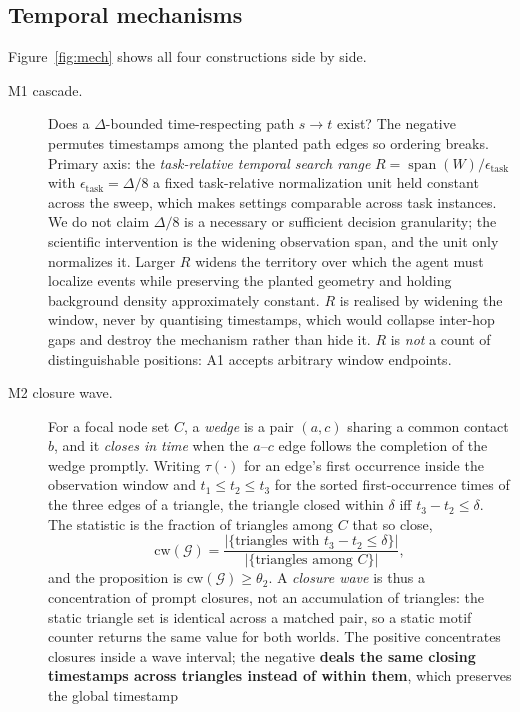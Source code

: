 \documentclass[sigconf,anonymous,review]{acmart}
\begin{document}
\subsection{Temporal mechanisms}
Figure~\ref{fig:mech} shows all four constructions side by side.

\begin{description}
\item[M1 cascade.] Does a $\Delta$-bounded time-respecting path $s\!\to\!t$ exist? The negative
permutes timestamps among the planted path edges so ordering breaks. Primary axis: the \emph{task-relative temporal
search range} $R=\operatorname{span}(W)/\epsilon_{\text{task}}$ with
$\epsilon_{\text{task}}=\Delta/8$ a fixed task-relative normalization unit
held constant across the sweep, which makes settings comparable across task instances. We do not
claim $\Delta/8$ is a necessary or sufficient decision granularity; the scientific intervention is
the widening observation span, and the unit only normalizes it. Larger $R$ widens the territory over which the agent must localize events while
preserving the planted geometry and holding background density approximately constant. $R$ is
realised by widening the window, never by quantising timestamps, which would collapse inter-hop
gaps and destroy the mechanism rather than hide it. $R$ is \emph{not} a count of distinguishable
positions: A1 accepts arbitrary window endpoints.
\item[M2 closure wave.] For a focal node set $C$, a \emph{wedge} is a pair $(a,c)$ sharing a
common contact $b$, and it \emph{closes in time} when the $a$--$c$ edge follows the completion of
the wedge promptly. Writing $\tau(\cdot)$ for an edge's first occurrence inside the observation
window and $t_1\!\le\!t_2\!\le\!t_3$ for the sorted first-occurrence times of the three edges of a
triangle, the triangle closed within $\delta$ iff $t_3-t_2\le\delta$. The statistic is the fraction
of triangles among $C$ that so close,
\[
\mathrm{cw}(\mathcal{G})=\frac{|\{\text{triangles with } t_3-t_2\le\delta\}|}
                              {|\{\text{triangles among } C\}|},
\]
and the proposition is $\mathrm{cw}(\mathcal{G})\ge\theta_2$. A \emph{closure wave} is thus a
concentration of prompt closures, not an accumulation of triangles: the static triangle set is
identical across a matched pair, so a static motif counter returns the same value for both worlds.
The positive concentrates closures inside a wave interval; the negative \textbf{deals the same
closing timestamps across triangles instead of within them}, which preserves the global timestamp

\end{description}
\end{document}

